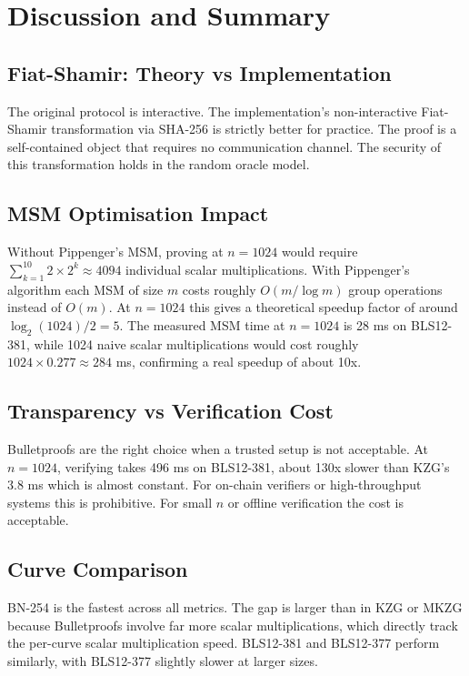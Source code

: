 \section{Discussion and Summary}

\subsection{Fiat-Shamir: Theory vs Implementation}

The original protocol is interactive. The implementation's
non-interactive Fiat-Shamir transformation via SHA-256 is strictly
better for practice. The proof is a self-contained object that
requires no communication channel. The security of this
transformation holds in the random oracle model.

\subsection{MSM Optimisation Impact}

Without Pippenger's MSM, proving at $n = 1024$ would require
$\sum_{k=1}^{10} 2 \times 2^k \approx 4094$ individual scalar
multiplications. With Pippenger's algorithm each MSM of size $m$
costs roughly $O(m / \log m)$ group operations instead of $O(m)$.
At $n = 1024$ this gives a theoretical speedup factor of around
$\log_2(1024)/2 = 5$. The measured MSM time at $n = 1024$ is
28 ms on BLS12-381, while 1024 naive scalar multiplications would
cost roughly $1024 \times 0.277 \approx 284$ ms, confirming a
real speedup of about 10x.

\subsection{Transparency vs Verification Cost}

Bulletproofs are the right choice when a trusted setup is not
acceptable. At $n = 1024$, verifying takes 496 ms on BLS12-381,
about 130x slower than KZG's 3.8 ms which is almost constant. For on-chain verifiers or
high-throughput systems this is prohibitive. For small $n$ or
offline verification the cost is acceptable.

\subsection{Curve Comparison}

BN-254 is the fastest across all metrics. The gap is larger than
in KZG or MKZG because Bulletproofs involve far more scalar
multiplications, which directly track the per-curve scalar
multiplication speed. BLS12-381 and BLS12-377 perform similarly,
with BLS12-377 slightly slower at larger sizes.

